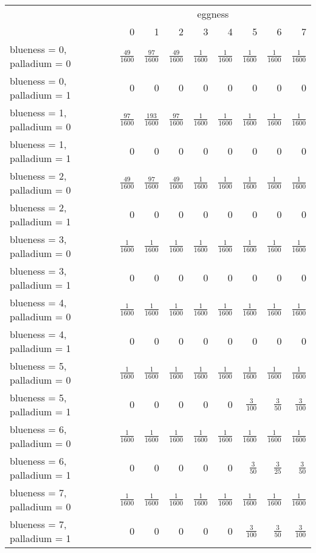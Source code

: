 \documentclass{article}
\begin{document}
\begin{table}[h!]
    \begin{tabular}{l|r|r|r|r|r|r|r|r|}
      & \multicolumn{8}{c}{eggness} \\
      & 0 & 1 & 2 & 3 & 4 & 5 & 6 & 7 \\
      \hline
blueness = 0, palladium = 0 & $\frac{49}{1600}$ & $\frac{97}{1600}$ & $\frac{49}{1600}$ & $\frac{1}{1600}$ & $\frac{1}{1600}$ & $\frac{1}{1600}$ & $\frac{1}{1600}$ & $\frac{1}{1600}$ \\ \hline
blueness = 0, palladium = 1 & $0$ & $0$ & $0$ & $0$ & $0$ & $0$ & $0$ & $0$ \\ \hline
blueness = 1, palladium = 0 & $\frac{97}{1600}$ & $\frac{193}{1600}$ & $\frac{97}{1600}$ & $\frac{1}{1600}$ & $\frac{1}{1600}$ & $\frac{1}{1600}$ & $\frac{1}{1600}$ & $\frac{1}{1600}$ \\ \hline
blueness = 1, palladium = 1 & $0$ & $0$ & $0$ & $0$ & $0$ & $0$ & $0$ & $0$ \\ \hline
blueness = 2, palladium = 0 & $\frac{49}{1600}$ & $\frac{97}{1600}$ & $\frac{49}{1600}$ & $\frac{1}{1600}$ & $\frac{1}{1600}$ & $\frac{1}{1600}$ & $\frac{1}{1600}$ & $\frac{1}{1600}$ \\ \hline
blueness = 2, palladium = 1 & $0$ & $0$ & $0$ & $0$ & $0$ & $0$ & $0$ & $0$ \\ \hline
blueness = 3, palladium = 0 & $\frac{1}{1600}$ & $\frac{1}{1600}$ & $\frac{1}{1600}$ & $\frac{1}{1600}$ & $\frac{1}{1600}$ & $\frac{1}{1600}$ & $\frac{1}{1600}$ & $\frac{1}{1600}$ \\ \hline
blueness = 3, palladium = 1 & $0$ & $0$ & $0$ & $0$ & $0$ & $0$ & $0$ & $0$ \\ \hline
blueness = 4, palladium = 0 & $\frac{1}{1600}$ & $\frac{1}{1600}$ & $\frac{1}{1600}$ & $\frac{1}{1600}$ & $\frac{1}{1600}$ & $\frac{1}{1600}$ & $\frac{1}{1600}$ & $\frac{1}{1600}$ \\ \hline
blueness = 4, palladium = 1 & $0$ & $0$ & $0$ & $0$ & $0$ & $0$ & $0$ & $0$ \\ \hline
blueness = 5, palladium = 0 & $\frac{1}{1600}$ & $\frac{1}{1600}$ & $\frac{1}{1600}$ & $\frac{1}{1600}$ & $\frac{1}{1600}$ & $\frac{1}{1600}$ & $\frac{1}{1600}$ & $\frac{1}{1600}$ \\ \hline
blueness = 5, palladium = 1 & $0$ & $0$ & $0$ & $0$ & $0$ & $\frac{3}{100}$ & $\frac{3}{50}$ & $\frac{3}{100}$ \\ \hline
blueness = 6, palladium = 0 & $\frac{1}{1600}$ & $\frac{1}{1600}$ & $\frac{1}{1600}$ & $\frac{1}{1600}$ & $\frac{1}{1600}$ & $\frac{1}{1600}$ & $\frac{1}{1600}$ & $\frac{1}{1600}$ \\ \hline
blueness = 6, palladium = 1 & $0$ & $0$ & $0$ & $0$ & $0$ & $\frac{3}{50}$ & $\frac{3}{25}$ & $\frac{3}{50}$ \\ \hline
blueness = 7, palladium = 0 & $\frac{1}{1600}$ & $\frac{1}{1600}$ & $\frac{1}{1600}$ & $\frac{1}{1600}$ & $\frac{1}{1600}$ & $\frac{1}{1600}$ & $\frac{1}{1600}$ & $\frac{1}{1600}$ \\ \hline
blueness = 7, palladium = 1 & $0$ & $0$ & $0$ & $0$ & $0$ & $\frac{3}{100}$ & $\frac{3}{50}$ & $\frac{3}{100}$ \\ \hline
    \end{tabular}
\end{table}
\end{document}
